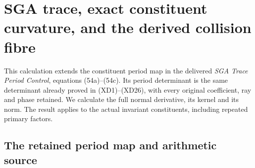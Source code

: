 \section{SGA trace, exact constituent curvature, and the derived collision fibre}
\label{sec:sga-constituent-period-curvature}

This calculation extends the constituent period map in the delivered
\emph{SGA Trace Period Control}, equations (54a)--(54c).  Its period
determinant is the same determinant already proved in (XD1)--(XD26),
with every original coefficient, ray and phase retained.  We calculate
the full normal derivative, its kernel and its norm.  The result applies
to the actual invariant constituents, including repeated primary factors.

\subsection{The retained period map and arithmetic source}

